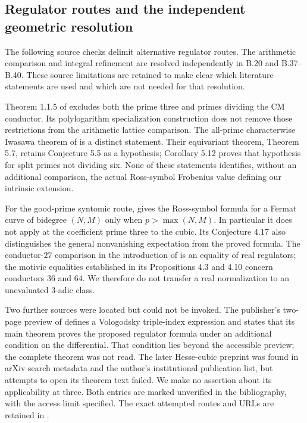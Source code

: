 \subsection{Regulator routes and the independent geometric resolution}

The following source checks delimit alternative regulator
routes. The arithmetic comparison and integral refinement are
resolved independently in B.20 and B.37--B.40. These source
limitations are retained to make clear which literature statements
are used and which are not needed for that resolution.

Theorem 1.1.5 of \citet{BKings2001} excludes both the prime three
and primes dividing the CM conductor.  Its polylogarithm
specialization construction does not remove those restrictions from
the arithmetic lattice comparison.  The all-prime characterwise
Iwasawa theorem of \citet[Theorem 5.2]{BJohnsonLeungKings2011}
is a distinct statement.  Their equivariant theorem, Theorem 5.7,
retains Conjecture 5.5 as a hypothesis; Corollary 5.12 proves that
hypothesis for split primes not dividing six.  None of these
statements identifies, without an additional comparison, the actual
Ross-symbol Frobenius value defining our intrinsic extension.

For the good-prime syntomic route,
\citet[Theorem 4.11]{RootAsakura2023} gives the Ross-symbol formula
for a Fermat curve of bidegree $(N,M)$ only when
$p>\max(N,M)$.  In particular it does not apply at the coefficient
prime three to the cubic.  Its Conjecture 4.17 also distinguishes
the general nonvanishing expectation from the proved formula.
The conductor-$27$ comparison in the introduction of
\citet{BNemoto2025} is an equality of real regulators; the motivic
equalities established in its Propositions 4.3 and 4.10 concern
conductors $36$ and $64$.  We therefore do not transfer a real
normalization to an unevaluated $3$-adic class.

Two further sources were located but could not be invoked.
The publisher's two-page preview of \citet{RootBesser2021}
defines a Vologodsky triple-index expression and states that its
main theorem proves the proposed regulator formula under an
additional condition on the differential.  That condition lies
beyond the accessible preview; the complete theorem was not read.
The later Hesse-cubic preprint \citep{RootNemoto2026} was found in
arXiv search metadata and the author's institutional publication
list, but attempts to open its theorem text failed.  We make no
assertion about its applicability at three.  Both entries are
marked unverified in the bibliography, with the access limit
specified.  The exact attempted routes and URLs are retained in
.

